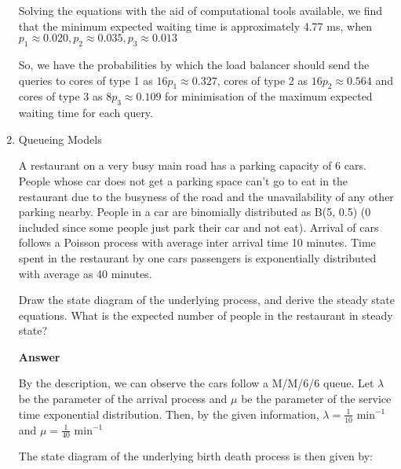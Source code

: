 \documentclass[12pt, oneside]{article}
\begin{document}
\begin{enumerate}
{    Solving the equations with the aid of computational tools available, we find that the minimum expected waiting time
    is approximately 4.77 ms, when \(p_1 \approx 0.020, p_2 \approx 0.035, p_3 \approx 0.013\)

    So, we have the probabilities by which the load balancer should send the queries to
    cores of type 1 as \(16p_1 \approx 0.327\), cores of type 2 as \(16p_2 \approx 0.564\)
    and cores of type 3 as \(8p_3 \approx 0.109\) for minimisation of the maximum expected
    waiting time for each query.
}

\item {
    Queueing Models

    A restaurant on a very busy main road has a parking capacity of 6 cars. People whose car
    does not get a parking space can't go to eat in the restaurant due to the busyness of
    the road and the unavailability of any other parking nearby. People in a car are binomially
    distributed as B(5, 0.5) (0 included since some people just park their car and not eat). 
    Arrival of cars follows a Poisson process with average inter arrival time 10 minutes.
    Time spent in the restaurant by one cars passengers is exponentially distributed with 
    average as 40 minutes.

    Draw the state diagram of the underlying process, and derive the steady state equations.
    What is the expected number of people in the restaurant in steady state?

    \textbf{Answer}

    By the description, we can observe the cars follow a M/M/6/6 queue.
    Let \(\lambda\) be the parameter of the arrival process and \(\mu\) be the parameter 
    of the service time exponential distribution. Then, by the given information,
    \(\lambda = \frac{1}{10} \text{ min}^{-1}\) and \(\mu = \frac{1}{40} \text{ min}^{-1}\)
    
    The state diagram of the underlying birth death process is then given by:

    }
\end{enumerate}
\end{document}
